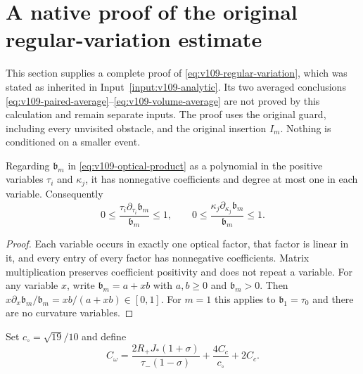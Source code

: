 \section{A native proof of the original regular-variation estimate}
\label{sec:el-variation}
This section supplies a complete proof of
\eqref{eq:v109-regular-variation}, which was stated as inherited in
Input~\ref{input:v109-analytic}. Its two averaged conclusions
\eqref{eq:v109-paired-average}--\eqref{eq:v109-volume-average} are
not proved by this calculation and remain separate inputs. The proof
uses the original guard, including every unvisited obstacle, and the
original insertion $I_m$. Nothing is conditioned on a smaller event.

\begin{lemma}
\label{lem:el-logden}
Regarding $\mathfrak b_m$ in \eqref{eq:v109-optical-product} as a
polynomial in the positive variables $\tau_i$ and $\kappa_j$, it has
nonnegative coefficients and degree at most one in each variable.
Consequently
\begin{equation}\label{eq:el-logden}
 0\leq\frac{\tau_i\partial_{\tau_i}\mathfrak b_m}{\mathfrak b_m}\leq1,
 \qquad
 0\leq\frac{\kappa_j\partial_{\kappa_j}\mathfrak b_m}{\mathfrak b_m}\leq1.
\end{equation}
\end{lemma}
\begin{proof}
Each variable occurs in exactly one optical factor, that factor is
linear in it, and every entry of every factor has nonnegative
coefficients. Matrix multiplication preserves coefficient positivity
and does not repeat a variable. For any variable $x$, write
$\mathfrak b_m=a+xb$ with $a,b\geq0$ and $\mathfrak b_m>0$.
Then $x\partial_x\mathfrak b_m/\mathfrak b_m=xb/(a+xb)\in[0,1]$.
For $m=1$ this applies to $\mathfrak b_1=\tau_0$ and there are no
curvature variables.
\end{proof}

Set $c_\circ=\sqrt{19}/10$ and define
\begin{equation}\label{eq:el-omega-constant}
 C_\omega=
 \frac{2R_+J_*(1+\sigma)}{\tau_-(1-\sigma)}
       +\frac{4C_c}{c_\circ}+2C_c.
\end{equation}

